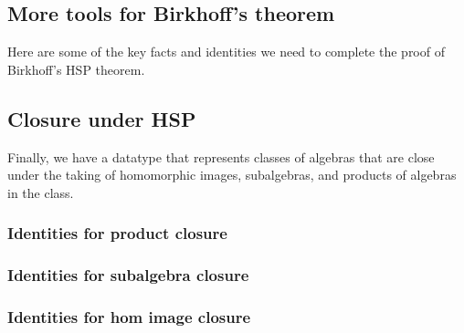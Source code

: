 \documentclass[a4paper,USenglish,cleveref,autoref,thm-restate]{lipics-v2019}
\begin{document}
\subsection{More tools for Birkhoff's theorem}\label{sec:more-tools-for-birkhoffs-theorem}
Here are some of the key facts and identities we need to complete the proof of Birkhoff's HSP theorem.
\begin{code}\end{code}


\subsection{Closure under HSP}\label{sec:closure-under-hsp}
Finally, we have a datatype that represents classes of algebras that are close under the taking of homomorphic images, subalgebras, and products of algebras in the class.
\subsubsection{Identities for product closure}\label{sec:identities-for-product-closure}
\begin{code}\end{code}


\subsubsection{Identities for subalgebra closure}\label{sec:identities-for-subalgebra-closure}
\begin{code}\end{code}

\subsubsection{Identities for hom image closure}\label{sec:identities-for-hom-image-closure}
\begin{code}\end{code}
\end{document}
